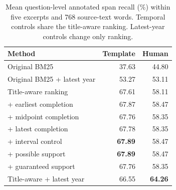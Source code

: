 \begin{table}[t]
\centering\small
\begin{tabular}{@{}lrr@{}}
\toprule
Method & Template & Human\\
\midrule
Original BM25 & 37.63 & 44.80\\
Original BM25 + latest year & 53.27 & 53.11\\
Title-aware ranking & 67.61 & 58.11\\
\quad + earliest completion & 67.87 & 58.47\\
\quad + midpoint completion & 67.76 & 58.35\\
\quad + latest completion & 67.78 & 58.35\\
\quad + interval control & \textbf{67.89} & 58.47\\
\quad + possible support & \textbf{67.89} & 58.47\\
\quad + guaranteed support & 67.76 & 58.35\\
Title-aware + latest year & 66.55 & \textbf{64.26}\\
\bottomrule
\end{tabular}
\caption{Mean question-level annotated span recall (\%) within five excerpts and 768 source-text words. Temporal controls share the title-aware ranking. Latest-year controls change only ranking.}
\label{tab:matched}
\end{table}

